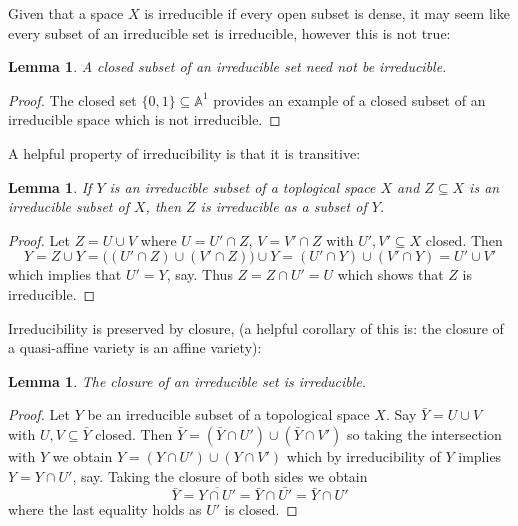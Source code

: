 \documentclass[12pt]{article}
\theoremstyle{plain}
\newtheorem{lemma}[thm]{Lemma}
\theoremstyle{definition}
\newcommand{\bb}[1]{\mathbb{#1}}
\begin{document}
Given that a space $X$ is irreducible if every open subset is dense, it may seem like every subset of an irreducible set is irreducible, however this is not true:
\begin{lemma}
A closed subset of an irreducible set need not be irreducible.
\end{lemma}
\begin{proof}
The closed set $\lbrace 0, 1 \rbrace \subseteq \bb{A}^1$ provides an example of a closed subset of an irreducible space which is not irreducible.
\end{proof}
A helpful property of irreducibility is that it is transitive:
\begin{lemma}\label{lem:irred_subset_irred}
If $Y$ is an irreducible subset of a toplogical space $X$ and $Z\subseteq X$ is an irreducible subset of $X$, then $Z$ is irreducible as a subset of $Y$.
\end{lemma}
\begin{proof}
Let $Z = U \cup V$ where $U = U' \cap Z$, $V = V' \cap Z$ with $U',V' \subseteq X$ closed. Then
\[Y = Z\cup Y = \big( (U' \cap Z) \cup (V' \cap Z)\big) \cup Y = (U' \cap Y) \cup (V' \cap Y) = U' \cup V'\]
which implies that $U'= Y$, say. Thus $Z = Z \cap U' = U$ which shows that $Z$ is irreducible.
\end{proof}
Irreducibility is preserved by closure, (a helpful corollary of this is: the closure of a quasi-affine variety is an affine variety):
\begin{lemma}
The closure of an irreducible set is irreducible.
\end{lemma}
\begin{proof}
Let $Y$ be an irreducible subset of a topological space $X$. Say $\bar{Y} = U \cup V$ with $U,V \subseteq \bar{Y}$ closed. Then $\bar{Y} = (\bar{Y} \cap U') \cup (\bar{Y} \cap V')$ so taking the intersection with $Y$ we obtain $Y = (Y \cap U') \cup (Y \cap V')$ which by irreducibility of $Y$ implies $Y = Y \cap U'$, say. Taking the closure of both sides we obtain 
\[\bar{Y} = \overline{Y \cap U'} = \bar{Y} \cap \bar{U'} = \bar{Y} \cap U'\]
where the last equality holds as $U'$ is closed.
\end{proof}
\end{document}
